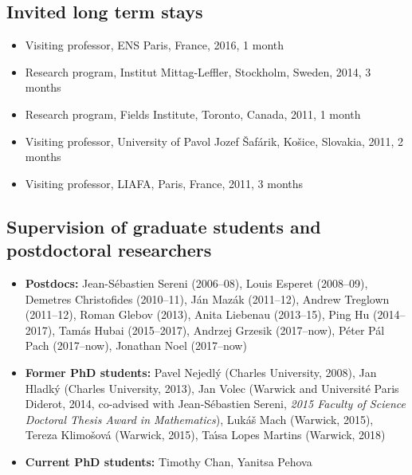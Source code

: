 \documentclass[11pt]{article}
\begin{document}
\subsection*{Invited long term stays}
\begin{itemize}
\setlength\itemsep{-1mm}
\item Visiting professor, ENS Paris, France, 2016, 1 month
\item Research program, Institut Mittag-Leffler, Stockholm, Sweden, 2014, 3 months
\item Research program, Fields Institute, Toronto, Canada, 2011, 1 month
\item Visiting professor, University of Pavol Jozef \v{S}af\'arik, Ko\v sice, Slovakia, 2011, 2 months
\item Visiting professor, LIAFA, Paris, France, 2011, 3 months
\end{itemize}

\subsection*{Supervision of graduate students and postdoctoral researchers}
\begin{itemize}
\setlength\itemsep{-1mm}
\item {\bf Postdocs:} Jean-S\' ebastien Sereni (2006--08), Louis Esperet (2008--09), Demetres Christofides (2010--11), J\'an Maz\'ak (2011--12), Andrew Treglown (2011--12), Roman Glebov (2013), Anita Liebenau (2013--15), Ping Hu (2014--2017), Tam\'as Hubai (2015--2017), Andrzej Grzesik (2017--now), P\'eter P\'al Pach (2017--now), Jonathan Noel (2017--now)
\item {\bf Former PhD students:} Pavel Nejedl\'y (Charles University, 2008), Jan Hladk\'y (Charles University, 2013), Jan Volec (Warwick and Universit\'e Paris Diderot, 2014, co-advised with Jean-S\'ebastien Sereni, {\em 2015 Faculty of Science Doctoral Thesis Award in Mathematics\/}), Luk\'a\v s Mach (Warwick, 2015), Tereza Klimo\v sov\'a (Warwick, 2015), Ta\'\i{}sa Lopes Martins (Warwick, 2018)
\item {\bf Current PhD students:} Timothy Chan, Yanitsa Pehova
\end{itemize}

\newpage
\end{document}
